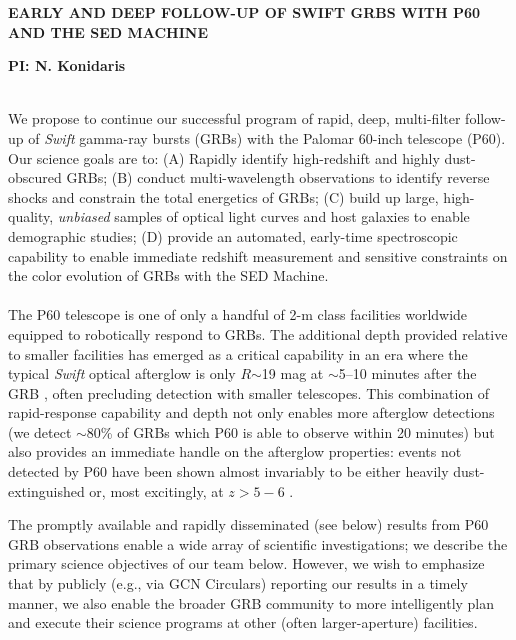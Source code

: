 \documentclass[letterpaper,11pt]{article}
\begin{document}
\pagestyle{plain}

\begin{center} 
\bfseries\uppercase{Early and Deep Follow-up of Swift GRBs with P60
and the SED Machine}
\end{center}
\vspace{-0.3cm}
\centerline{\bf PI: {N. Konidaris}}
 
\smallskip\\
We propose to continue our successful program of rapid, deep, multi-filter
follow-up of \textit{Swift} gamma-ray bursts (GRBs) with the Palomar 
60-inch telescope (P60).  Our science goals are to: (A) Rapidly identify 
high-redshift and highly dust-obscured GRBs; (B) conduct multi-wavelength
observations to identify reverse shocks and constrain the total energetics
of GRBs; (C) build up large, high-quality, \textit{unbiased} samples of
optical light curves and host galaxies to enable demographic studies;
(D) provide an automated, early-time spectroscopic capability to enable
immediate redshift measurement and sensitive constraints on the color 
evolution of GRBs with the SED Machine. \\


\smallskip\\
The P60 telescope is one of only a handful of 2-m class facilities worldwide
equipped to robotically respond to GRBs.  The additional depth provided 
relative to smaller facilities has emerged as a critical capability in an 
era where the typical \textit{Swift} optical afterglow is only $R$$\sim$19 mag at 
$\sim$5--10 minutes after the GRB \citep{ckh+09,as+07}, often precluding 
detection with smaller telescopes.  This combination of rapid-response 
capability and depth not only enables more afterglow detections (we 
detect $\sim$80\% of GRBs which P60 is able to observe within 20 minutes) 
but also provides an immediate handle on the afterglow properties: events 
not detected by P60 have been shown almost invariably to be either heavily 
dust-extinguished or, most excitingly, at $z>5-6$ \citep{ckh+09,pcb+09}.

The promptly available and rapidly disseminated (see below) results
from P60 GRB observations enable a wide array of scientific investigations;
we describe the primary science objectives of our team below.  However, we
wish to emphasize that by publicly (e.g., via GCN Circulars) reporting our
results in a timely manner, we also enable the broader GRB
community to more intelligently plan and execute their science programs
at other (often larger-aperture) facilities. 
\end{document}
